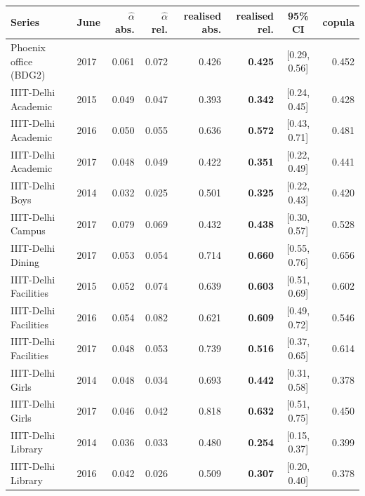 \begin{table}[t]
\centering
\scriptsize
\setlength{\tabcolsep}{3pt}
\begin{tabular}{llrrrrcr}
\toprule
Series & June & $\hat\alpha$ abs. & $\hat\alpha$ rel. & realised abs. & realised rel. & 95\% CI & copula \\
\midrule
Phoenix office (BDG2) & 2017 & 0.061 & 0.072 & 0.426 & \textbf{0.425} & [0.29, 0.56] & 0.452 \\
\midrule
IIIT-Delhi Academic & 2015 & 0.049 & 0.047 & 0.393 & \textbf{0.342} & [0.24, 0.45] & 0.428 \\
IIIT-Delhi Academic & 2016 & 0.050 & 0.055 & 0.636 & \textbf{0.572} & [0.43, 0.71] & 0.481 \\
IIIT-Delhi Academic & 2017 & 0.048 & 0.049 & 0.422 & \textbf{0.351} & [0.22, 0.49] & 0.441 \\
IIIT-Delhi Boys & 2014 & 0.032 & 0.025 & 0.501 & \textbf{0.325} & [0.22, 0.43] & 0.420 \\
IIIT-Delhi Campus & 2017 & 0.079 & 0.069 & 0.432 & \textbf{0.438} & [0.30, 0.57] & 0.528 \\
IIIT-Delhi Dining & 2017 & 0.053 & 0.054 & 0.714 & \textbf{0.660} & [0.55, 0.76] & 0.656 \\
IIIT-Delhi Facilities & 2015 & 0.052 & 0.074 & 0.639 & \textbf{0.603} & [0.51, 0.69] & 0.602 \\
IIIT-Delhi Facilities & 2016 & 0.054 & 0.082 & 0.621 & \textbf{0.609} & [0.49, 0.72] & 0.546 \\
IIIT-Delhi Facilities & 2017 & 0.048 & 0.053 & 0.739 & \textbf{0.516} & [0.37, 0.65] & 0.614 \\
IIIT-Delhi Girls & 2014 & 0.048 & 0.034 & 0.693 & \textbf{0.442} & [0.31, 0.58] & 0.378 \\
IIIT-Delhi Girls & 2017 & 0.046 & 0.042 & 0.818 & \textbf{0.632} & [0.51, 0.75] & 0.450 \\
IIIT-Delhi Library & 2014 & 0.036 & 0.033 & 0.480 & \textbf{0.254} & [0.15, 0.37] & 0.399 \\
IIIT-Delhi Library & 2016 & 0.042 & 0.026 & 0.509 & \textbf{0.307} & [0.20, 0.40] & 0.378 \\
\bottomrule
\end{tabular}

\end{table}
